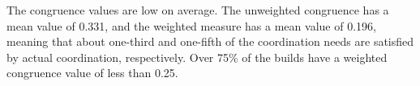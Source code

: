 The congruence values are low on average. The unweighted congruence has a mean value of 0.331, and the weighted measure has a mean value of 0.196, meaning that about one-third and one-fifth of the coordination needs are satisfied by actual coordination, respectively. Over 75\% of the builds have a weighted congruence value of less than 0.25.

\begin{figure}[t]
  \centering
\end{figure}
